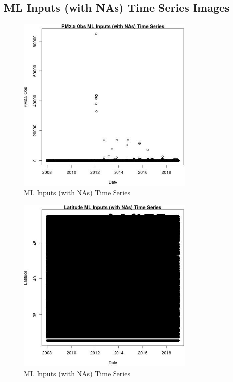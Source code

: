 
\subsection{ML Inputs (with NAs) Time Series Images} 
 

\begin{figure} 
\centering  
\includegraphics[width=0.77\textwidth]{Code_Outputs/Report_ML_input_PM25_Step4_part_f_de_duplicated_aveswNAs_PM25_ObsvDate.jpg} 
\caption{\label{fig:Report_ML_input_PM25_Step4_part_f_de_duplicated_aveswNAsPM25_ObsvDate}ML Inputs (with NAs) Time Series} 
\end{figure} 
 

\begin{figure} 
\centering  
\includegraphics[width=0.77\textwidth]{Code_Outputs/Report_ML_input_PM25_Step4_part_f_de_duplicated_aveswNAs_LatitudevDate.jpg} 
\caption{\label{fig:Report_ML_input_PM25_Step4_part_f_de_duplicated_aveswNAsLatitudevDate}ML Inputs (with NAs) Time Series} 
\end{figure} 
 

